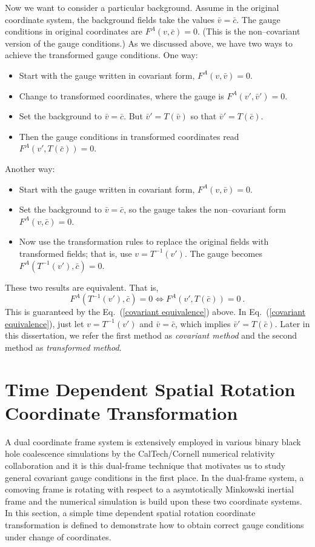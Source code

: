 Now we want to consider a particular background. Assume in the original coordinate system, the background fields take the values $\bar v = \bar c$. The gauge 
conditions in original coordinates are $F^A\left(v,\bar c\right) = 0$. (This is the non--covariant version of the gauge conditions.) As we discussed above, we have two ways to achieve the transformed gauge conditions. One way: 
\begin{itemize}
	\item Start with the gauge written in covariant form, $F^A\left(v,\bar v\right) = 0$.
	\item Change to transformed coordinates, where the gauge is $F^A\left(v',\bar v'\right) = 0$.
	\item Set the background to $\bar v = \bar c$. But $\bar v' = T\left(\bar v\right)$ so that $\bar v' = T\left(\bar c\right)$. 
	\item Then the gauge conditions in transformed coordinates read $F^A\left(v',T\left(\bar c\right)\right) = 0$. 
\end{itemize}
Another way: 
\begin{itemize}
	\item Start with the gauge written in covariant form, $F^A\left(v,\bar v\right) = 0$.
	\item Set the background to $\bar v = \bar c$, so the gauge takes the non--covariant form $F^A\left(v,\bar c\right) = 0$. 
	\item Now use the transformation rules to replace the original fields with transformed fields; that is, use $v = T^{-1}\left(v'\right)$. 
	The gauge becomes $F^A\left(T^{-1}\left(v'\right),\bar c\right) = 0$. 
\end{itemize}
These two results are equivalent. That is, 
\begin{equation}
	F^A\left(T^{-1}\left(v'\right),\bar c\right) = 0 \Longleftrightarrow F^A\left(v',T\left(\bar c\right)\right) = 0 \ .
\end{equation}
This is guaranteed by the Eq.~(\ref{covariant equivalence}) above. In Eq.~(\ref{covariant equivalence}), just let $v = T^{-1}\left(v'\right)$ and $\bar v = \bar c$, which implies $\bar v' = T\left(\bar c\right)$. Later in this dissertation, we refer the first method as {\em covariant method} and the second method as {\em transformed method}. 
\section{Time Dependent Spatial Rotation Coordinate Transformation}\label{example}
A dual coordinate frame system\cite{Scheel:2006gg} is extensively employed in various binary black hole coalescence simulations\cite{Scheel:2008rj, Szilagyi:2009qz} by the CalTech/Cornell numerical relativity collaboration and it is this dual-frame technique that motivates us to study general covariant gauge conditions in the first place. In the dual-frame system, a comoving frame is rotating with respect to a asymtotically Minkowski inertial frame and the numerical simulation is build upon these two coordinate systems. In this section, a simple time dependent spatial rotation coordinate transformation is defined to demonstrate how to obtain correct gauge conditions under change of coordinates. 


